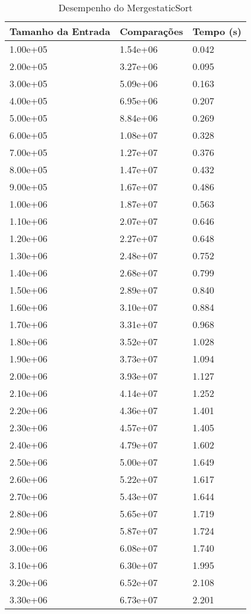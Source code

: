 \begin{table}
\caption{Desempenho do MergestaticSort}
\label{tab:merge_staticsort}
\begin{tabular}{lll}
\toprule
Tamanho da Entrada & Comparações & Tempo (s) \\
\midrule
1.00e+05 & 1.54e+06 & 0.042 \\
2.00e+05 & 3.27e+06 & 0.095 \\
3.00e+05 & 5.09e+06 & 0.163 \\
4.00e+05 & 6.95e+06 & 0.207 \\
5.00e+05 & 8.84e+06 & 0.269 \\
6.00e+05 & 1.08e+07 & 0.328 \\
7.00e+05 & 1.27e+07 & 0.376 \\
8.00e+05 & 1.47e+07 & 0.432 \\
9.00e+05 & 1.67e+07 & 0.486 \\
1.00e+06 & 1.87e+07 & 0.563 \\
1.10e+06 & 2.07e+07 & 0.646 \\
1.20e+06 & 2.27e+07 & 0.648 \\
1.30e+06 & 2.48e+07 & 0.752 \\
1.40e+06 & 2.68e+07 & 0.799 \\
1.50e+06 & 2.89e+07 & 0.840 \\
1.60e+06 & 3.10e+07 & 0.884 \\
1.70e+06 & 3.31e+07 & 0.968 \\
1.80e+06 & 3.52e+07 & 1.028 \\
1.90e+06 & 3.73e+07 & 1.094 \\
2.00e+06 & 3.93e+07 & 1.127 \\
2.10e+06 & 4.14e+07 & 1.252 \\
2.20e+06 & 4.36e+07 & 1.401 \\
2.30e+06 & 4.57e+07 & 1.405 \\
2.40e+06 & 4.79e+07 & 1.602 \\
2.50e+06 & 5.00e+07 & 1.649 \\
2.60e+06 & 5.22e+07 & 1.617 \\
2.70e+06 & 5.43e+07 & 1.644 \\
2.80e+06 & 5.65e+07 & 1.719 \\
2.90e+06 & 5.87e+07 & 1.724 \\
3.00e+06 & 6.08e+07 & 1.740 \\
3.10e+06 & 6.30e+07 & 1.995 \\
3.20e+06 & 6.52e+07 & 2.108 \\
3.30e+06 & 6.73e+07 & 2.201 \\

\end{tabular}
\end{table}
